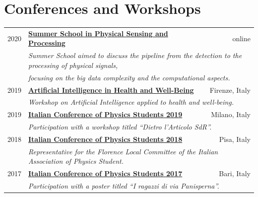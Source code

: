 \documentclass[a4, 11pt]{report}
\begin{document}
    \section*{Conferences and Workshops}
        \begin{tabular*}{\textwidth}{rl @{\extracolsep{\fill}} r}
            {\small 2020} & \href{https://site.unibo.it/school-physical-sensing-and-processing/en}{\textbf{Summer School in Physical Sensing and Processing}} & {\small online}\\
            & \multicolumn{2}{l}{\small \emph{Summer School aimed to discuss the pipeline from the detection to the processing of physical signals,}}\\
            & \multicolumn{2}{l}{\small \emph {focusing on the big data complexity and the computational aspects.}}\\ [3 mm]
            
            {\small 2019} & \href{http://www.diitet.cnr.it/workshop-artificial-intelligence-in-health-and-well-being/}{\textbf{Artificial Intelligence in Health and Well-Being}} & {\small Firenze, Italy}\\
            & \multicolumn{2}{l}{\small \emph{Workshop on Artificial Intelligence applied to health and well-being.}}\\ [3 mm]
            
            {\small 2019} & \href{http://ai-sf.it/cisf19/}{\textbf{Italian Conference of Physics Students 2019}} & {\small Milano, Italy}\\
            & \multicolumn{2}{l}{\small \emph{Participation with a workshop titled ``Dietro l'Articolo SdR''.}}\\ [3 mm]
            
            {\small 2018} & \href{http://ai-sf.it/cisf18/}{\textbf{Italian Conference of Physics Students 2018}} & {\small Pisa, Italy}\\
            & \multicolumn{2}{l}{\small \emph{Representative for the Florence Local Committee of the Italian Association of Physics Student.}}\\ [3 mm]
            
            {\small 2017} & \href{http://www.ai-sf.it/cisf2017/}{\textbf{Italian Conference of Physics Students 2017}} & {\small Bari, Italy}\\
            & \multicolumn{2}{l}{\small \emph{Participation with a poster titled ``I ragazzi di via Panisperna''.}}\\ [3 mm]
        \end{tabular*}
        
\end{document}
